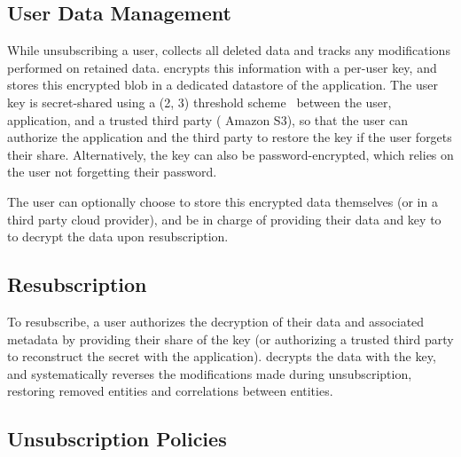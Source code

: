 \subsection{User Data Management}
\label{sec:design:storage}
While unsubscribing a user, \proto collects all deleted data and tracks any modifications performed
on retained data.  \proto encrypts this information with a per-user key, and stores this encrypted
blob in a dedicated datastore of the application. The user key is secret-shared using a (2, 3)
threshold scheme~\cite{secretsharing} between the user, application, and a trusted third party (\eg
Amazon S3), so that the user can authorize the application and the third party to restore the key if
the user forgets their share.  Alternatively, the key can also be password-encrypted, which relies
on the user not forgetting their password.

The user can optionally choose to store this encrypted data themselves (or in a third party cloud
provider), and be in charge of providing their data and key to \proto to decrypt the data upon
resubscription.

\subsection{Resubscription}
To resubscribe, a user authorizes the decryption of their data and associated metadata by
providing their share of the key (or authorizing a trusted third party to reconstruct the secret
with the application). \proto decrypts the data with the key, and systematically reverses 
the modifications made during unsubscription, restoring removed entities and correlations between
entities.

\subsection{Unsubscription Policies}
\label{sec:design:unsub}

